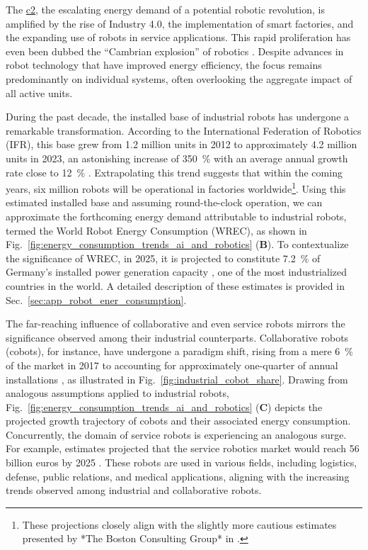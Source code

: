 \documentclass[12pt]{article}
\begin{document}
The \underline{\ac{c2}}, the escalating energy demand of a potential robotic revolution, is amplified by the rise of Industry 4.0, the implementation of smart factories, and the expanding use of robots in service applications. This rapid proliferation has even been dubbed the ``Cambrian explosion'' of robotics \cite{Pratt2015Iscambrianexplosion}. Despite advances in robot technology that have improved energy efficiency, the focus remains predominantly on individual systems, often overlooking the aggregate impact of all active units.

During the past decade, the installed base of industrial robots has undergone a remarkable transformation. According to the International Federation of Robotics (IFR), this base grew from 1.2 million units in 2012 to approximately 4.2 million units in 2023, an astonishing increase of 350~\% with an average annual growth rate close to 12~\% \cite{IFR2024WorldRobotics2024}. Extrapolating this trend suggests that within the coming years, six million robots will be operational in factories worldwide\footnote{These projections closely align with the slightly more cautious estimates presented by *The Boston Consulting Group* in \cite{Sirkin2015HowRobotsWill}.}. Using this estimated installed base and assuming round-the-clock operation, we can approximate the forthcoming energy demand attributable to industrial robots, termed the World Robot Energy Consumption (WREC), as shown in Fig.~\ref{fig:energy_consumption_trends_ai_and_robotics} (\textbf{B}). To contextualize the significance of WREC, in 2025, it is projected to constitute 7.2~\% of Germany's installed power generation capacity \cite{FraunhoferISENetinstalledelectricity}, one of the most industrialized countries in the world. A detailed description of these estimates is provided in Sec.~\ref{sec:app_robot_ener_consumption}.

The far-reaching influence of collaborative and even service robots mirrors the significance observed among their industrial counterparts. Collaborative robots (cobots), for instance, have undergone a paradigm shift, rising from a mere 6~\% of the market in 2017 to accounting for approximately one-quarter of annual installations \cite{tobe2015}, as illustrated in Fig.~\ref{fig:industrial_cobot_share}. Drawing from analogous assumptions applied to industrial robots, Fig.~\ref{fig:energy_consumption_trends_ai_and_robotics} (\textbf{C}) depicts the projected growth trajectory of cobots and their associated energy consumption. Concurrently, the domain of service robots is experiencing an analogous surge. For example, estimates projected that the service robotics market would reach 56 billion euros by 2025 \cite{statista_service_robots}. These robots are used in various fields, including logistics, defense, public relations, and medical applications, aligning with the increasing trends observed among industrial and collaborative robots.
\end{document}
